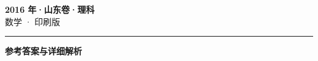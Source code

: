 \documentclass[zihao=5, a4paper]{ctexart}
\begin{document}
\begin{center}
  {\Large\bfseries 2016 年·山东卷·理科}\\[4pt]
  {\large 数学 · 印刷版}
\end{center}
\medskip
{}

\par\bigskip\hrule\bigskip
{}
\begin{center}{\large\bfseries 参考答案与详细解析}\end{center}
\smallskip

\end{document}
